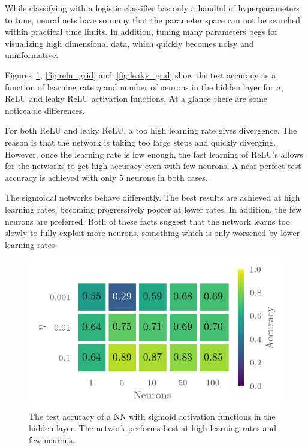 While classifying with a logistic classifier has only a handful of
hyperparameters to tune, neural nets have so many that the parameter space can
not be searched within practical time limits. In addition, tuning many
parameters begs for visualizing high dimensional data, which quickly becomes
noisy and uninformative. 

Figures~\ref{fig:sigmoid_grid}, \ref{fig:relu_grid} and~\ref{fig:leaky_grid}
show the test accuracy as a function of learning rate \(\eta\) and number of
neurons in the hidden layer for \(\sigma\), ReLU and leaky ReLU activation
functions. At a glance there are some noticeable differences.

For both ReLU and leaky ReLU, a too high learning rate gives divergence. The
reason is that the network is taking too large steps and
quickly diverging. However, once the learning rate is low enough, the fast
learning of ReLU's allows for the networks to get high accuracy even with few
neurons. A near perfect test accuracy is achieved with only \(5\) neurons in
both cases. 

The sigmoidal networks behave differently. The best results are achieved at high
learning rates, becoming progressively poorer at lower rates. In addition, the
few neurons are preferred. Both of these facts suggest that the network learns
too slowly to fully exploit more neurons, something which is only worsened by
lower learning rates.

\begin{figure}[H]
  \centering
  \includegraphics[]{figures/sigmoidgrid.png}
  \caption{\label{fig:sigmoid_grid} The test accuracy of a NN with sigmoid
    activation functions in the hidden layer. The network performs best at high learning
    rates and few neurons. }
\end{figure}

